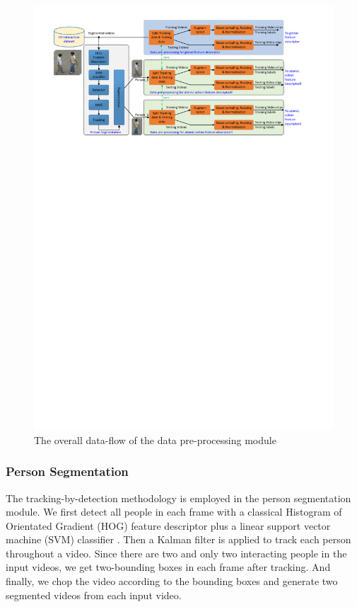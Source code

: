 \begin{figure}
	\includegraphics[trim=2cm 20.5cm 0cm 1cm]{fig01/vpp.pdf}
	\caption{The overall data-flow of the data pre-processing module}
	\label{fig:vpp}
\end{figure}

\subsubsection*{Person Segmentation}
\label{personDetection}
The tracking-by-detection methodology is employed in the person segmentation module. We first detect all people in each frame with a classical Histogram of Orientated Gradient (HOG) feature descriptor plus a linear support vector machine (SVM) classifier \cite{hog}. Then a Kalman filter is applied to track each person throughout a video. Since there are two and only two interacting people in the input videos, we get two-bounding boxes in each frame after tracking. And finally, we chop the video according to the bounding boxes and generate two segmented videos from each input video.

